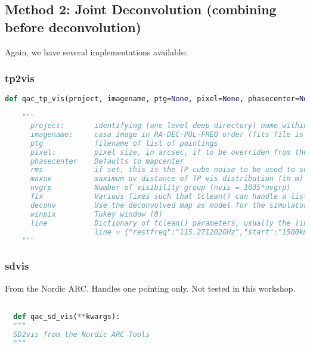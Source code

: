 \documentclass[12pt,a4paper]{article}
\begin{document}
\subsection{Method 2: Joint Deconvolution (combining before deconvolution)}

Again, we have several implementations available:

\subsubsection{tp2vis}

\begin{lstlisting}[language=Python]
def qac_tp_vis(project, imagename, ptg=None, pixel=None, phasecenter=None, rms=None, maxuv=10.0, nvgrp=4, fix=1, deconv=True, winpix=0, **line):    
           
    """
      project:       identifying (one level deep directory) name within which all files are places
      imagename:     casa image in RA-DEC-POL-FREQ order (fits file is ok too)
      ptg            filename of list of pointings
      pixel:         pixel size, in arcsec, if to be overriden from the input map. 
      phasecenter    Defaults to mapcenter
      rms            if set, this is the TP cube noise to be used to set the weights
      maxuv          maximum uv distance of TP vis distribution (in m)  [10m] 
      nvgrp          Number of visibility group (nvis = 1035*nvgrp)
      fix            Various fixes such that tclean() can handle a list of ms [fix=1]
      deconv         Use the deconvolved map as model for the simulator.
      winpix         Tukey window [0]
      line           Dictionary of tclean() parameters, usually the line parameters are useful, e.g.
                     line = {"restfreq":"115.271202GHz","start":"1500km/s", "width":"5km/s","nchan":5}
    """
\end{lstlisting}

\subsubsection{sdvis}

From the Nordic ARC. Handles one pointing only. Not tested in this workshop.

\begin{lstlisting}[language=Python]

  def qac_sd_vis(**kwargs):
  """
  SD2vis from the Nordic ARC Tools
  """

\end{lstlisting}
\end{document}

